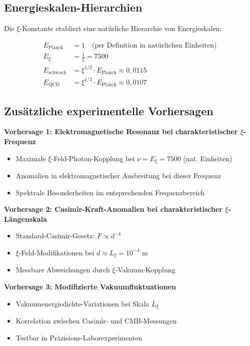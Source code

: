 \documentclass[12pt,a4paper]{article}
\begin{document}
	\subsection{Energieskalen-Hierarchien}
	
	Die $\xi$-Konstante etabliert eine natürliche Hierarchie von Energieskalen:
	
	\begin{align}
		E_{\text{Planck}} &= 1 \quad \text{(per Definition in natürlichen Einheiten)} \\
		E_\xi &= \frac{1}{\xi} = 7500 \\
		E_{\text{schwach}} &= \xi^{1/2} \cdot E_{\text{Planck}} \approx 0,0115 \\
		E_{\text{QCD}} &= \xi^{1/3} \cdot E_{\text{Planck}} \approx 0,0107
	\end{align}
	
	\subsection{Zusätzliche experimentelle Vorhersagen}
	
	\textbf{Vorhersage 1: Elektromagnetische Resonanz bei charakteristischer $\xi$-Frequenz}
	\begin{itemize}
		\item Maximale $\xi$-Feld-Photon-Kopplung bei $\nu = E_\xi = 7500$ (nat. Einheiten)
		\item Anomalien in elektromagnetischer Ausbreitung bei dieser Frequenz
		\item Spektrale Besonderheiten im entsprechenden Frequenzbereich
	\end{itemize}
	
	\textbf{Vorhersage 2: Casimir-Kraft-Anomalien bei charakteristischer $\xi$-Längenskala}
	\begin{itemize}
		\item Standard-Casimir-Gesetz: $F \propto d^{-4}$
		\item $\xi$-Feld-Modifikationen bei $d \approx L_\xi = 10^{-4}$ m
		\item Messbare Abweichungen durch $\xi$-Vakuum-Kopplung
	\end{itemize}
	
	\textbf{Vorhersage 3: Modifizierte Vakuumfluktuationen}
	\begin{itemize}
		\item Vakuumenergiedichte-Variationen bei Skala $L_\xi$
		\item Korrelation zwischen Casimir- und CMB-Messungen
		\item Testbar in Präzisions-Laborexperimenten
	\end{itemize}
	
\end{document}
